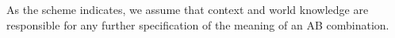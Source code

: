 As the scheme indicates, we assume that context and world knowledge are
responsible for any further specification of the meaning of an AB combination. 
